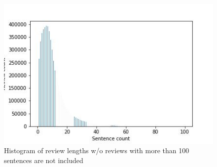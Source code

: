 \documentclass[11pt]{article}
\begin{document}
\begin{figure}[h]
    \centering
    \includegraphics[width=\columnwidth]{img/imdb-sentence-length-hist.jpg}
    \caption{Histogram of review lengths w/o reviews with more than 100 sentences are not included}
    \label{fig:imdb-sentence-hist}
\end{figure}
\end{document}
